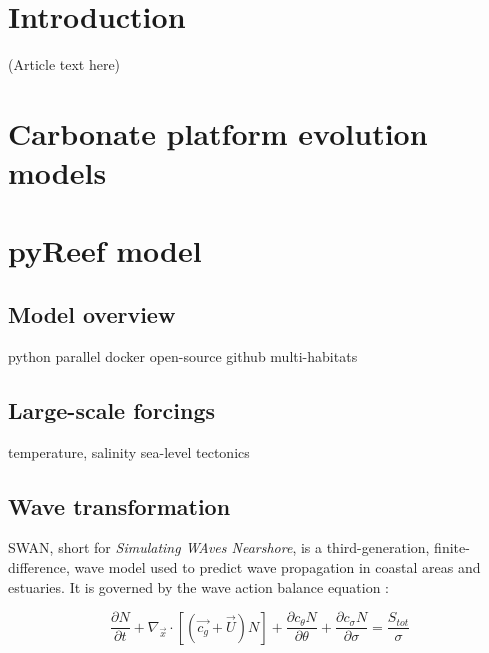 \documentclass[default,jgrga]{agutex2015}
\begin{document}
\begin{article}

%
%

\section{Introduction}
(Article text here)

\section{Carbonate platform evolution models}

\section{pyReef model}

\subsection{Model overview}

python parallel docker open-source github multi-habitats

\subsection{Large-scale forcings}

temperature, salinity sea-level tectonics 

\subsection{Wave transformation}

SWAN, short for \textit{Simulating WAves Nearshore}, is a third-generation, finite-difference, wave model used to predict wave propagation in coastal areas and estuaries. It is governed by the wave action balance equation \citep{Bretherton68, Hasselmann73, Holthuijsen93, Booij99}:

\begin{equation}
 \frac{\partial N}{\partial t}+\nabla_{\vec{x}} \cdot \left[ \left( \vec{c_g} + \vec{U} \right) N \right] + \frac{\partial c_{\theta}N}{\partial \theta} + \frac{\partial c_{\sigma}N}{\partial \sigma} = \frac{S_{tot}}{\sigma}
\end{equation}


\end{article}
\end{document}
